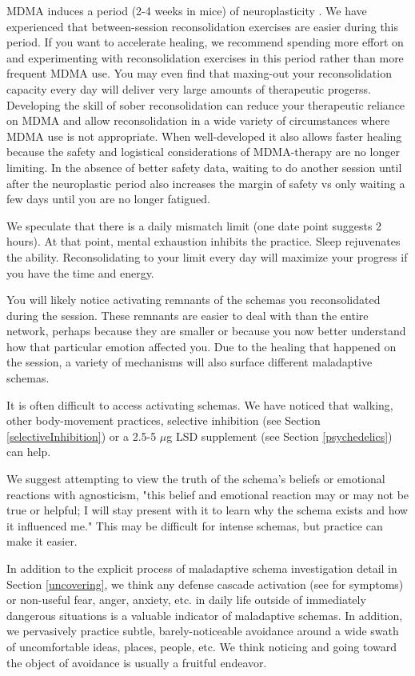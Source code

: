 \documentclass[12pt,letterpaper]{book}
\begin{document}
MDMA induces a period (2-4 weeks in mice) of neuroplasticity \cite{nardouMDMAPlasticity}. We have experienced that between-session reconsolidation exercises are easier during this period. If you want to accelerate healing, we recommend spending more effort on and experimenting with reconsolidation exercises in this period rather than more frequent MDMA use. You may even find that maxing-out your reconsolidation capacity every day will deliver very large amounts of therapeutic progerss. Developing the skill of sober reconsolidation can reduce your therapeutic reliance on MDMA and allow reconsolidation in a wide variety of circumstances where MDMA use is not appropriate. When well-developed it also allows faster healing because the safety and logistical considerations of MDMA-therapy are no longer limiting. In the absence of better safety data, waiting to do another session until after the neuroplastic period also increases the margin of safety vs only waiting a few days until you are no longer fatigued.

We speculate that there is a daily mismatch limit (one date point suggests 2 hours). At that point, mental exhaustion inhibits the practice. Sleep rejuvenates the ability. Reconsolidating to your limit every day will maximize your progress if you have the time and energy.

You will likely notice activating remnants of the schemas you reconsolidated during the session. These remnants are easier to deal with than the entire network, perhaps because they are smaller or because you now better understand how that particular emotion affected you. Due to the healing that happened on the session, a variety of mechanisms will also surface different maladaptive schemas.

It is often difficult to access activating schemas. We have noticed that walking, other body-movement practices, selective inhibition (see Section \ref{selectiveInhibition}) or a 2.5-5 $\mu$g LSD supplement (see Section \ref{psychedelics}) can help.

We suggest attempting to view the truth of the schema's beliefs or emotional reactions with agnosticism, "this belief and emotional reaction may or may not be true or helpful; I will stay present with it to learn why the schema exists and how it influenced me." This may be difficult for intense schemas, but practice can make it easier.

In addition to the explicit process of maladaptive schema investigation detail in Section \ref{uncovering}, we think any defense cascade activation (see \textcite{cheetahSigns} for symptoms) or non-useful fear, anger, anxiety, etc. in daily life outside of immediately dangerous situations is a valuable indicator of maladaptive schemas. In addition, we pervasively practice subtle, barely-noticeable avoidance around a wide swath of uncomfortable ideas, places, people, etc. We think noticing and going toward the object of avoidance is usually a fruitful endeavor.
\end{document}
